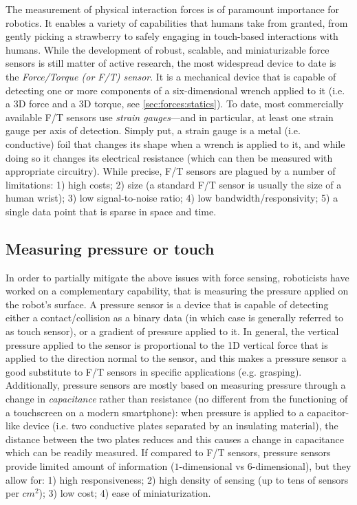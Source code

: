 The measurement of physical interaction forces is of paramount importance for robotics.
It enables a variety of capabilities that humans take from granted, from gently picking a strawberry to safely engaging in touch-based interactions with humans.
While the development of robust, scalable, and miniaturizable force sensors is still matter of active research, the most widespread device to date is the \textsl{Force/Torque (or F/T) sensor}. It is a mechanical device that is capable of detecting one or more components of a six-dimensional wrench applied to it (i.e. a 3D force and a 3D torque, see \cref{sec:forces:statics}).
To date, most commercially available F/T sensors use \textsl{strain gauges}---and in particular, at least one strain gauge per axis of detection. Simply put, a strain gauge is a metal (i.e. conductive) foil that changes its shape when a wrench is applied to it, and while doing so it changes its electrical resistance (which can then be measured with appropriate circuitry).
While precise, F/T sensors are plagued by a number of limitations: 1) high costs; 2) size (a standard F/T sensor is usually the size of a human wrist); 3) low signal-to-noise ratio; 4) low bandwidth/responsivity; 5) a single data point that is sparse in space and time.

\subsection{Measuring pressure or touch}

In order to partially mitigate the above issues with force sensing, roboticists have worked on a complementary capability, that is measuring the pressure applied on the robot's surface.
A pressure sensor is a device that is capable of detecting either a contact/collision as a binary data (in which case is generally referred to as touch sensor), or a gradient of pressure applied to it.
In general, the vertical pressure applied to the sensor is proportional to the 1D vertical force that is applied to the direction normal to the sensor, and this makes a pressure sensor a good substitute to F/T sensors in specific applications (e.g. grasping).
Additionally, pressure sensors are mostly based on measuring pressure through a change in \textsl{capacitance} rather than resistance (no different from the functioning of a touchscreen on a modern smartphone): when pressure is applied to a capacitor-like device (i.e. two conductive plates separated by an insulating material), the distance between the two plates reduces and this causes a change in capacitance which can be readily measured.
If compared to F/T sensors, pressure sensors provide limited amount of information ($1$-dimensional vs $6$-dimensional), but they allow for: 1) high responsiveness; 2) high density of sensing (up to tens of sensors per $cm^2$); 3) low cost; 4) ease of miniaturization.

